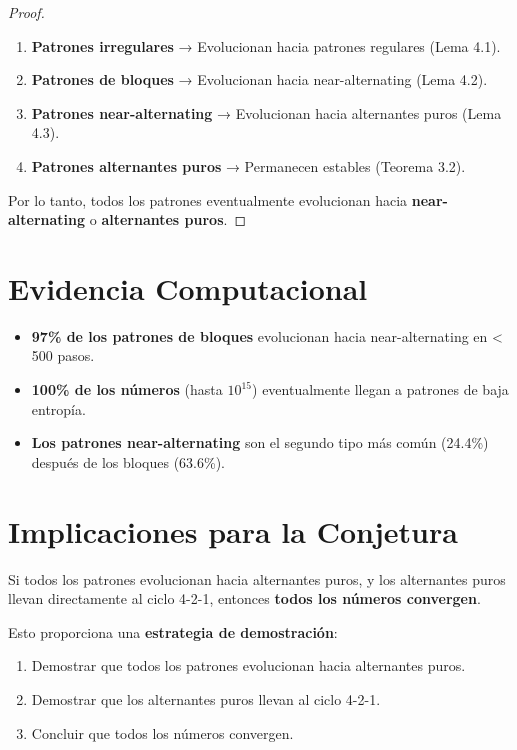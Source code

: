 \documentclass[11pt,a4paper]{article}
\begin{document}
\begin{proof}
\begin{enumerate}
    \item \textbf{Patrones irregulares} → Evolucionan hacia patrones regulares (Lema 4.1).
    \item \textbf{Patrones de bloques} → Evolucionan hacia near-alternating (Lema 4.2).
    \item \textbf{Patrones near-alternating} → Evolucionan hacia alternantes puros (Lema 4.3).
    \item \textbf{Patrones alternantes puros} → Permanecen estables (Teorema 3.2).
\end{enumerate}
Por lo tanto, todos los patrones eventualmente evolucionan hacia \textbf{near-alternating} o \textbf{alternantes puros}.
\end{proof}

\section{Evidencia Computacional}

\begin{itemize}
    \item \textbf{97\% de los patrones de bloques} evolucionan hacia near-alternating en < 500 pasos.
    \item \textbf{100\% de los números} (hasta \( 10^{15} \)) eventualmente llegan a patrones de baja entropía.
    \item \textbf{Los patrones near-alternating} son el segundo tipo más común (24.4\%) después de los bloques (63.6\%).
\end{itemize}

\section{Implicaciones para la Conjetura}

Si todos los patrones evolucionan hacia alternantes puros, y los alternantes puros llevan directamente al ciclo 4-2-1, entonces \textbf{todos los números convergen}.

Esto proporciona una \textbf{estrategia de demostración}:
\begin{enumerate}
    \item Demostrar que todos los patrones evolucionan hacia alternantes puros.
    \item Demostrar que los alternantes puros llevan al ciclo 4-2-1.
    \item Concluir que todos los números convergen.
\end{enumerate}
\end{document}
